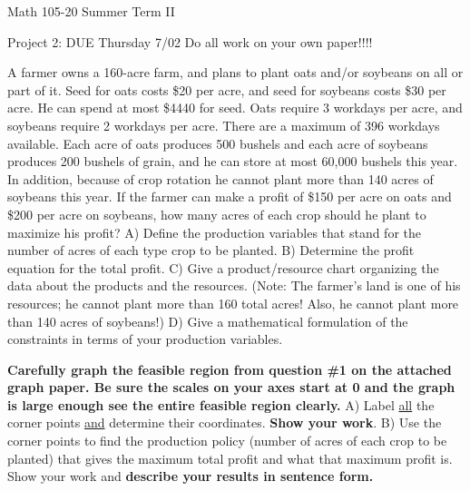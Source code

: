 \documentclass[11pt,epsfig]{article}
\begin{document}
Math 105-20 Summer Term II 

Project 2: DUE Thursday 7/02
\newline
Do all work on your own paper!!!!
\vspace{1pc}


\vspace{0.5pc}






\begin{problem}{25}
A farmer owns a 160-acre farm, and plans to plant oats and/or soybeans on all or part of it. Seed for oats costs \$20 per acre, and seed for soybeans costs \$30 per acre. He can spend at most \$4440 for seed. Oats require 3 workdays per acre, and soybeans require 2 workdays per acre. There are a maximum of 396 workdays available. Each acre of oats produces 500 bushels and each acre of soybeans produces 200 bushels of grain, and he can store at most 60,000 bushels this year. In addition, because of crop rotation he cannot plant more than 140 acres of soybeans this year. If the farmer can make a profit of \$150 per acre on oats and \$200 per acre on soybeans, how many acres of each crop should he plant to maximize his profit?
\newline
A) Define the production variables that stand for the number of acres of each type crop to be planted.
\newline
B) Determine the profit equation for the total profit.
\newline 
C) Give a product/resource chart organizing the data about the products and the resources.
(Note: The farmer’s land is one of his resources; he cannot plant more than 160 total acres!
Also, he cannot plant more than 140 acres of soybeans!)
\newline
D) Give a mathematical formulation of the constraints in terms of your production variables.
\vfill
\end{problem}

\begin{problem}{25}
\textbf{Carefully graph the feasible region from question \#1 on the attached graph paper. Be sure the scales on your axes start at 0 and the graph is large enough see the entire feasible region clearly.}
\newline
A)  Label \underline{all} the corner points \underline{and} determine their coordinates. \textbf{Show your work}.
\newline
B) Use the corner points to find the production policy (number of acres of each crop to be planted) that gives the maximum total profit and what that maximum profit is. Show your work and \textbf{describe your results in sentence form.}

\vfill
\end{problem}
\end{document}
